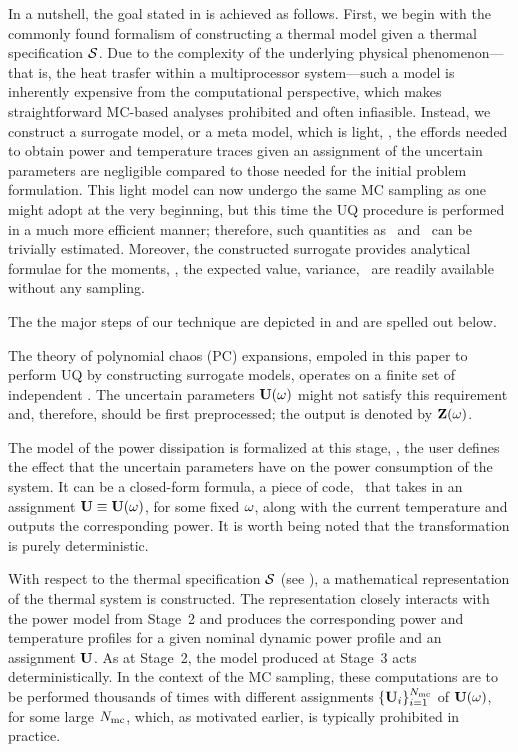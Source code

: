 
In a nutshell, the goal stated in  is achieved as follows. First, we begin with the commonly found formalism of constructing a thermal model given a thermal specification $\mathcal{S}$. Due to the complexity of the underlying physical phenomenon---that is, the heat trasfer within a multiprocessor system---such a model is inherently expensive from the computational perspective, which makes straightforward MC-based analyses prohibited and often infiasible. Instead, we construct a surrogate model, or a meta model, which is light, \ie, the effords needed to obtain power and temperature traces given an assignment of the uncertain parameters are negligible compared to those needed for the initial problem formulation. This light model can now undergo the same MC sampling as one might adopt at the very beginning, but this time the UQ procedure is performed in a much more efficient manner; therefore, such quantities as \cdfs\ and \pdfs\ can be trivially estimated. Moreover, the constructed surrogate provides analytical formulae for the moments, \ie, the expected value, variance, \etc\ are readily available without any sampling.

The the major steps of our technique are depicted in  and are spelled out below.

 The theory of polynomial chaos (PC) expansions, empoled in this paper to perform UQ by constructing surrogate models, operates on a finite set of independent \rvs. The uncertain parameters $\mathbf{U}(\omega)$ might not satisfy this requirement and, therefore, should be first preprocessed; the output is denoted by $\mathbf{Z}(\omega)$.

 The model of the power dissipation is formalized at this stage, \ie, the user defines the effect that the uncertain parameters have on the power consumption of the system. It can be a closed-form formula, a piece of code, \etc\ that takes in an assignment $\mathbf{U} \equiv \mathbf{U}(\omega)$, for some fixed $\omega$, along with the current temperature and outputs the corresponding power. It is worth being noted that the transformation is purely deterministic.

 With respect to the thermal specification $\mathcal{S}$ (see ), a mathematical representation of the thermal system is constructed. The representation closely interacts with the power model from Stage~2 and produces the corresponding power and temperature profiles for a given nominal dynamic power profile and an assignment $\mathbf{U}$. As at Stage~2, the model produced at Stage~3 acts deterministically. In the context of the MC sampling, these computations are to be performed thousands of times with different assignments $\{ \mathbf{U}_i \}_{i = 1}^{N_\text{mc}}$ of $\mathbf{U}(\omega)$, for some large $N_\text{mc}$, which, as motivated earlier, is typically prohibited in practice.

